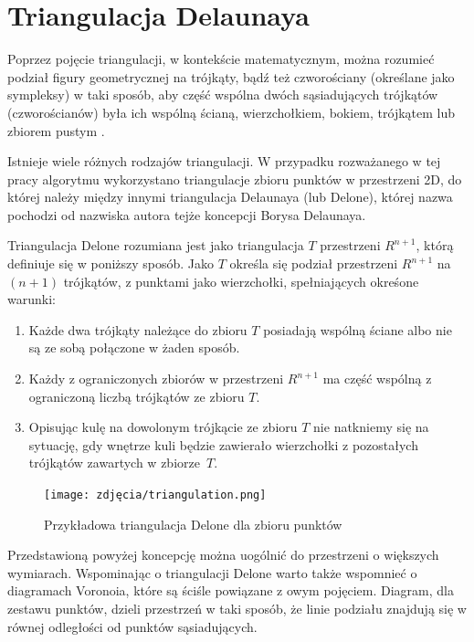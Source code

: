
\section{Triangulacja Delaunaya}
Poprzez pojęcie triangulacji, w kontekście matematycznym, można rozumieć podział figury geometrycznej na trójkąty, bądź też czworościany (określane jako sympleksy) w taki sposób, aby część wspólna dwóch sąsiadujących trójkątów (czworościanów) była ich wspólną ścianą, wierzchołkiem, bokiem, trójkątem lub zbiorem pustym \cite{triangulation}.

Istnieje wiele różnych rodzajów triangulacji. W przypadku rozważanego w tej pracy algorytmu wykorzystano triangulacje zbioru punktów w przestrzeni 2D, do której należy między innymi triangulacja Delaunaya (lub Delone), której nazwa pochodzi od nazwiska autora tejże koncepcji Borysa Delaunaya. 

Triangulacja Delone \cite{tDelone} rozumiana jest jako triangulacja $T$ przestrzeni $R^{n+1}$, którą definiuje się w poniższy sposób. Jako $T$ określa się podział przestrzeni $R^{n+1}$ na $(n+1)$ trójkątów, z punktami jako wierzchołki, spełniających okreśone warunki:

\begin{enumerate}
    \item Każde dwa trójkąty należące do zbioru $T$ posiadają wspólną ściane albo nie są ze sobą połączone w żaden sposób.
    \item Każdy z ograniczonych zbiorów w przestrzeni $R^{n+1}$ ma część wspólną z ograniczoną liczbą trójkątów ze zbioru $T$.
    \item Opisując kulę na dowolonym trójkącie ze zbioru $T$ nie natkniemy się na sytuację, gdy wnętrze kuli będzie zawierało wierzchołki z pozostałych trójkątów zawartych w zbiorze~$T$.
\end{enumerate}

\begin{figure}[h]
	\centering
	\texttt{[image: zdjęcia/triangulation.png]}
	\caption{Przykładowa triangulacja Delone dla zbioru punktów \cite{tDelone2}}
	\label{fig:delone}
\end{figure}

Przedstawioną powyżej koncepcję można uogólnić do przestrzeni o większych wymiarach. Wspominając o triangulacji Delone warto także wspomnieć o diagramach Voronoia, które są ściśle powiązane z owym pojęciem. Diagram, dla zestawu punktów, dzieli przestrzeń w taki sposób, że linie podziału znajdują się w równej odległości od punktów sąsiadujących.

